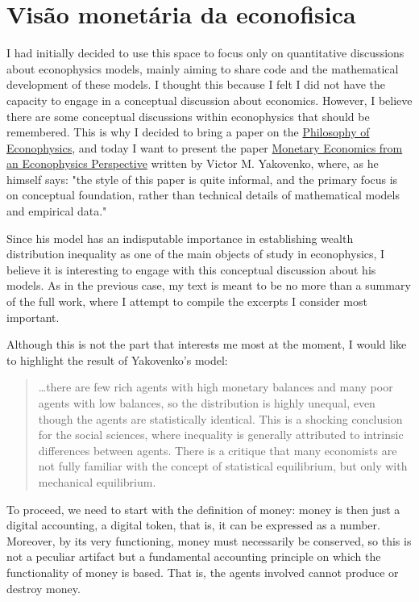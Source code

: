 \newpage
\section{Visão monetária da econofisica}

I had initially decided to use this space to focus only on quantitative discussions about econophysics models, mainly aiming to share code and the mathematical development of these models. I thought this because I felt I did not have the capacity to engage in a conceptual discussion about economics. However, I believe there are some conceptual discussions within econophysics that should be remembered. This is why I decided to bring a paper on the \href{https://github.com/jdansb/Econophysics/blob/main/files/Filosofia\%20da\%20Econof\%C3\%ADsica.md}{Philosophy of Econophysics}, and today I want to present the paper \href{https://arxiv.org/abs/1608.04832}{Monetary Economics from an Econophysics Perspective} written by Victor M. Yakovenko, where, as he himself says: "the style of this paper is quite informal, and the primary focus is on conceptual foundation, rather than technical details of mathematical models and empirical data."

Since his model has an indisputable importance in establishing wealth distribution inequality as one of the main objects of study in econophysics, I believe it is interesting to engage with this conceptual discussion about his models. As in the previous case, my text is meant to be no more than a summary of the full work, where I attempt to compile the excerpts I consider most important.

Although this is not the part that interests me most at the moment, I would like to highlight the result of Yakovenko's model:

\begin{quote}
…there are few rich agents with high monetary balances and many poor agents with low balances, so the distribution is highly unequal, even though the agents are statistically identical. This is a shocking conclusion for the social sciences, where inequality is generally attributed to intrinsic differences between agents. There is a critique that many economists are not fully familiar with the concept of statistical equilibrium, but only with mechanical equilibrium.

\end{quote}

To proceed, we need to start with the definition of money: money is then just a digital accounting, a digital token, that is, it can be expressed as a number. Moreover, by its very functioning, money must necessarily be conserved, so this is not a peculiar artifact but a fundamental accounting principle on which the functionality of money is based. That is, the agents involved cannot produce or destroy money.

